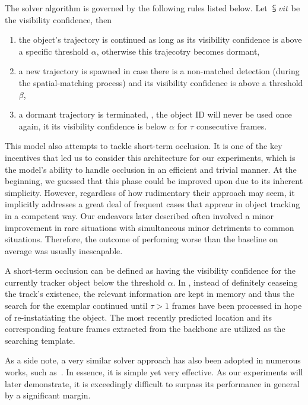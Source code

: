 
The solver algorithm is governed by the following rules listed below. Let $\subsup{v}{i}{t}$ be the visibility confidence, then
\begin{enumerate}
    \item the object's trajectory is continued as long as its visibility confidence is above a specific threshold $\alpha$, otherwise this trajecotry becomes dormant,
    \item a new trajectory is spawned in case there is a non-matched detection (during the spatial-matching process) and its visibility confidence is above a threshold $\beta$,
    \item a dormant trajectory is terminated, \ietext{}, the object ID will never be used once again, it its visibility confidence is below $\alpha$ for $\tau$ consecutive frames.
\end{enumerate}

This model also attempts to tackle short-term occlusion. It is one of the key incentives that led us to consider this architecture for our experiments, which is the model's ability to handle occlusion in an efficient and trivial manner. At the beginning, we guessed that this phase could be improved upon due to its inherent simplicity. However, regardless of how rudimentary their approach may seem, it implicitly addresses a great deal of frequent cases that apprear in object tracking in a competent way. Our endeavors later described often involved a minor improvement in rare situations with simultaneous minor detriments to common situations. Therefore, the outcome of perfoming worse than the baseline on average was usually inescapable.

A short-term occlusion can be defined as having the visibility confidence for the currently tracker object below the threshold $\alpha$. In \siammot{}, instead of definitely ceaseing the track's existence, the relevant information are kept in memory and thus the search for the exemplar continued until $\tau > 1$ frames have been processed in hope of re-instatiating the object. The most recently predicted location and its corresponding feature frames extracted from the backbone are utilized as the searching template.

As a side note, a very similar solver approach has also been adopted in numerous works, such as~\cite{bawley2016simple, wojke2017simple, zhou2020tracking, bergmann2019tracking}. In essence, it is simple yet very effective. As our experiments will later demonstrate, it is exceedingly difficult to surpass its performance in general by a significant margin.

